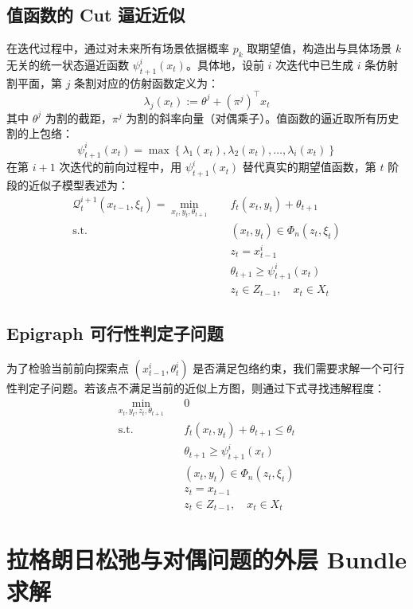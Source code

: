 \documentclass[11pt]{ctexart}
\begin{document}
\subsection{值函数的 Cut 逼近近似}
在迭代过程中，通过对未来所有场景依据概率 $p_k$ 取期望值，构造出与具体场景 $k$ 无关的统一状态逼近函数 $\psi_{t+1}^{i}(x_t)$。具体地，设前 $i$ 次迭代中已生成 $i$ 条仿射割平面，第 $j$ 条割对应的仿射函数定义为：
\begin{equation}
\lambda_{j}(x_t) := \theta^{j} + (\pi^{j})^\top x_t
\end{equation}
其中 $\theta^{j}$ 为割的截距，$\pi^{j}$ 为割的斜率向量（对偶乘子）。值函数的逼近取所有历史割的上包络：
\begin{equation}
\psi_{t+1}^{i}(x_t) = \max \left\{ \lambda_{1}(x_t), \lambda_{2}(x_t), \dots, \lambda_{i}(x_t) \right\}
\end{equation}
在第 $i+1$ 次迭代的前向过程中，用 $\psi_{t+1}^{i}(x_t)$ 替代真实的期望值函数，第 $t$ 阶段的近似子模型表述为：
\begin{align}
\mathcal{Q}_{t}^{i+1}(x_{t-1}, \xi_t) = \min_{x_t, y_t, \theta_{t+1}} \quad & f_{t}(x_{t}, y_{t}) + \theta_{t+1} \\
\text{s.t.} \quad & (x_{t}, y_{t}) \in \Phi_{n}(z_{t}, \xi_{t}) \\
& z_{t} = x_{t-1}^{i} \\
& \theta_{t+1} \ge \psi_{t+1}^{i}(x_{t}) \\
& z_{t} \in Z_{t-1}, \quad x_{t} \in X_{t}
\end{align}

\subsection{Epigraph 可行性判定子问题}
为了检验当前前向探索点 $(x_{t-1}^i, \theta_t^i)$ 是否满足包络约束，我们需要求解一个可行性判定子问题。若该点不满足当前的近似上方图，则通过下式寻找违解程度：
\begin{align}
\min_{x_t, y_t, z_t, \theta_{t+1}} \quad & 0 \\
\text{s.t.} \quad & f_t(x_t, y_t) + \theta_{t+1} \le \theta_{t} \\
& \theta_{t+1} \ge \psi_{t+1}^{i}(x_t) \\
& (x_{t}, y_{t}) \in \Phi_{n}(z_{t}, \xi_{t}) \\
& z_{t} = x_{t-1} \\
& z_{t} \in Z_{t-1}, \quad x_{t} \in X_{t}
\end{align}

\section{拉格朗日松弛与对偶问题的外层 Bundle 求解}
\end{document}
